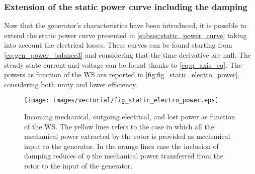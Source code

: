  \subsubsection[Power curve with damping]{Extension of the static power curve including the damping}\label{subsec:genertaor_power_curve}
 Now that the generator's characteristics have been introduced, it is possible to extend the static power curve presented in \autoref{subsec:static_power_curve} taking into account the electrical losses. These curves can be found starting from \autoref{eq:gen_power_balance3} and considering that the time derivative are null. The steady state current and voltage can be found thanks to \autoref{eq:q_axis_eq}. The powers as function of the \acrshort{WS} are reported in \autoref{fig:fig_static_electro_power}, considering both unity and lower efficiency.
\begin{figure}[htb]
  \centering
  \texttt{[image: images/vectorial/fig\_static\_electro\_power.eps]}
  \caption{Incoming mechanical, outgoing electrical, and lost power as function of the WS. The yellow lines refers to the case in which all the mechanical power extracted by the rotor is provided as mechanical input to the generator. In the orange lines case the inclusion of damping reduces of $\eta$ the mechanical power transferred from the rotor to the input of the generator. }
  \label{fig:fig_static_electro_power}
\end{figure}

 